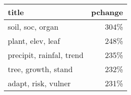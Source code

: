 \begin{tabular}{p{1.2cm}r}
\toprule
                    title &  pchange \\
\midrule
         soil, soc, organ &     304\% \\
        plant, elev, leaf &     248\% \\
 precipit, rainfal, trend &     235\% \\
      tree, growth, stand &     232\% \\
      adapt, risk, vulner &     231\% \\
\bottomrule
\end{tabular}
